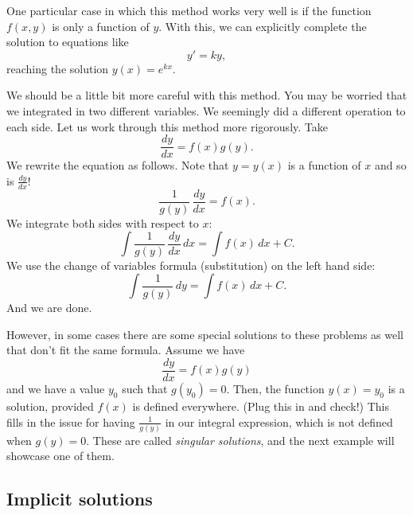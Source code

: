 One particular case in which this method works very well is if the function $f(x,y)$ is only a function of $y$. With this, we can explicitly complete the solution to equations like
\begin{equation*}
y' = ky,
\end{equation*}
reaching the solution $y(x) = e^{kx}$. 

We should be a little bit more careful with this method.  You may be worried 
that we 
integrated in two different variables.
We seemingly did
a different operation to each side.  Let us work through this method more
rigorously.  Take
\begin{equation*}
\frac{dy}{dx} = f(x)g(y) .
\end{equation*}
We rewrite the equation as follows.
Note that $y = y(x)$ is a function of $x$ and so is
$\frac{dy}{dx}$!
\begin{equation*}
\frac{1}{g(y)}\,\frac{dy}{dx} = f(x) .
\end{equation*}
We integrate both sides with respect to $x$:
\begin{equation*}
\int \frac{1}{g(y)}\,\frac{dy}{dx} \,dx = \int f(x) \,dx + C .
\end{equation*}
We use the change of variables formula (substitution) on the left hand side:
\begin{equation*}
\int \frac{1}{g(y)}\,dy = \int f(x) \,dx + C .
\end{equation*}
And we are done.

However, in some cases there are some special solutions to these problems as well that don't fit the same formula. Assume we have
\begin{equation*}
\frac{dy}{dx} = f(x)g(y)
\end{equation*}
and we have a value $y_0$ such that $g(y_0) = 0$. Then, the function $y(x) = y_0$ is a solution, provided $f(x)$ is defined everywhere. (Plug this in and check!) This fills in the issue for having $\frac{1}{g(y)}$ in our integral expression, which is not defined when $g(y) = 0$. These are called \emph{singular solutions}, and the next example will showcase one of them. 

\subsection{Implicit solutions}

